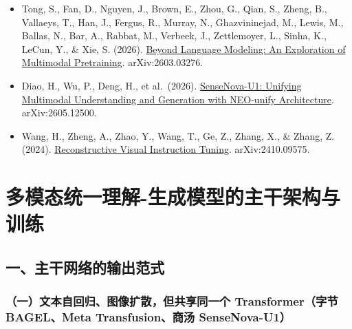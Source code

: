 \begin{itemize}
\item
  Tong, S., Fan, D., Nguyen, J., Brown, E., Zhou, G., Qian, S., Zheng, B., Vallaeys, T., Han, J., Fergus, R., Murray, N., Ghazvininejad, M., Lewis, M., Ballas, N., Bar, A., Rabbat, M., Verbeek, J., Zettlemoyer, L., Sinha, K., LeCun, Y., \& Xie, S. (2026). \href{https://arxiv.org/abs/2603.03276}{Beyond Language Modeling: An Exploration of Multimodal Pretraining}. arXiv:2603.03276.
\item
  Diao, H., Wu, P., Deng, H., et al.~(2026). \href{https://arxiv.org/abs/2605.12500}{SenseNova-U1: Unifying Multimodal Understanding and Generation with NEO-unify Architecture}. arXiv:2605.12500.
\item
  Wang, H., Zheng, A., Zhao, Y., Wang, T., Ge, Z., Zhang, X., \& Zhang, Z. (2024). \href{https://arxiv.org/abs/2410.09575}{Reconstructive Visual Instruction Tuning}. arXiv:2410.09575.
\end{itemize}

\clearpage

\hypertarget{ux591aux6a21ux6001ux7edfux4e00ux7406ux89e3-ux751fux6210ux6a21ux578bux7684ux4e3bux5e72ux67b6ux6784ux4e0eux8badux7ec3}{%
\section{多模态统一理解-生成模型的主干架构与训练}\label{ux591aux6a21ux6001ux7edfux4e00ux7406ux89e3-ux751fux6210ux6a21ux578bux7684ux4e3bux5e72ux67b6ux6784ux4e0eux8badux7ec3}}

\hypertarget{ux4e00ux4e3bux5e72ux7f51ux7edcux7684ux8f93ux51faux8303ux5f0f}{%
\subsection{一、主干网络的输出范式}\label{ux4e00ux4e3bux5e72ux7f51ux7edcux7684ux8f93ux51faux8303ux5f0f}}

\hypertarget{ux4e00ux6587ux672cux81eaux56deux5f52ux56feux50cfux6269ux6563ux4f46ux5171ux4eabux540cux4e00ux4e2a-transformerux5b57ux8282-bagelmeta-transfusionux5546ux6c64-sensenova-u1}{%
\subsubsection{（一）文本自回归、图像扩散，但共享同一个 Transformer（字节 BAGEL、Meta Transfusion、商汤 SenseNova-U1）}\label{ux4e00ux6587ux672cux81eaux56deux5f52ux56feux50cfux6269ux6563ux4f46ux5171ux4eabux540cux4e00ux4e2a-transformerux5b57ux8282-bagelmeta-transfusionux5546ux6c64-sensenova-u1}}

